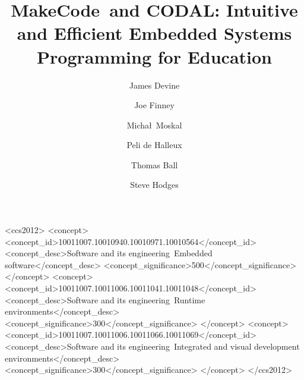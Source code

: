 \documentclass[sigplan, screen]{acmart}
\newcommand{\MC}{MakeCode\ }
\newcommand{\CON}{CODAL}
\begin{document}
\title[Embedded Systems Programming for Education]{\MC and \CON: Intuitive and Efficient Embedded Systems Programming for Education}         %

{}


\author{James Devine}

\author{Joe Finney}

\author{Micha\l\ Moskal}

\author{Peli de Halleux}

\author{Thomas Ball}

\author{Steve Hodges}



\begin{CCSXML}
  <ccs2012>
  <concept>
  <concept_id>10011007.10010940.10010971.10010564</concept_id>
  <concept_desc>Software and its engineering~Embedded software</concept_desc>
  <concept_significance>500</concept_significance>
  </concept>
  <concept>
  <concept_id>10011007.10011006.10011041.10011048</concept_id>
  <concept_desc>Software and its engineering~Runtime environments</concept_desc>
  <concept_significance>300</concept_significance>
  </concept>
  <concept>
  <concept_id>10011007.10011006.10011066.10011069</concept_id>
  <concept_desc>Software and its engineering~Integrated and visual development environments</concept_desc>
  <concept_significance>300</concept_significance>
  </concept>
  </ccs2012>
\end{CCSXML}
\end{document}
